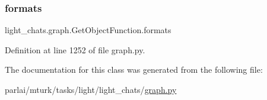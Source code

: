 \subsubsection{\texorpdfstring{formats}{formats}}
{\footnotesize\ttfamily light\+\_\+chats.\+graph.\+Get\+Object\+Function.\+formats}



Definition at line 1252 of file graph.\+py.



The documentation for this class was generated from the following file\+:\begin{DoxyCompactItemize}
\item 
parlai/mturk/tasks/light/light\+\_\+chats/\hyperlink{parlai_2mturk_2tasks_2light_2light__chats_2graph_8py}{graph.\+py}\end{DoxyCompactItemize}
